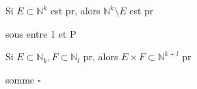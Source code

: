 \begin{corollary}[Privé]\label{col:prive}
    Si \(E \subset \mathbb{N}^{k}\) est pr, alors \(\mathbb{N}^{k} \setminus E\) est pr 
\end{corollary}
\begin{explanation}
    sous entre 1 et P
\end{explanation}

\begin{corollary}\label{col:prodcart}
    Si \(E \subset \mathbb{N}_{k}, F \subset \mathbb{N}_{l}\) pr, alors \(E \times F \subset \mathbb{N}^{k+l}\) pr  
\end{corollary}

\begin{explanation}
    somme \(\square\) 
\end{explanation}
